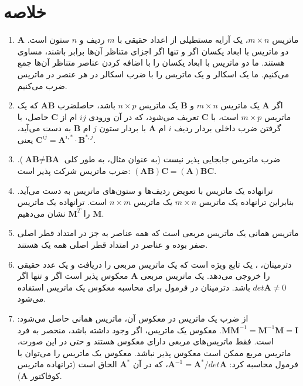\section{\textbf{خلاصه}}
\label{sec:2.9}
{
    \Large
    \begin{spacing}{1.5}
        \begin{enumerate}[label=\textbf{\arabic*}.]
            \item {$\textbf{A}$ ماتریس $m\times n$، یک آرایه مستطیلی از اعداد حقیقی با $m$ ردیف و $n$ ستون است.
            دو ماتریس با ابعاد یکسان اگر و تنها اگر اجزای متناظر آن‌ها برابر باشند، مساوی هستند.
            ما دو ماتریس با ابعاد یکسان را با اضافه کردن عناصر متناظر آن‌ها جمع می‌کنیم.
            ما یک اسکالر و یک ماتریس را با ضرب اسکالر در هر عنصر در ماتریس ضرب می‌کنیم.}

            \item {اگر $\textbf{A}$ یک ماتریس $m\times n$ و $\textbf{B}$ یک ماتریس $n\times p$ باشد،
            حاصلضرب $\textbf{AB}$ که یک ماتریس $m\times p$ است، با $\textbf{C}$ تعریف می‌شود،
            که در آن ورودی $ij$ ام از $\textbf{C}$ حاصل، با گرفتن ضرب داخلی بردار ردیف $i$ ام $\textbf{A}$ با بردار ستون $j$ ام $\textbf{B}$ به دست می‌آید، یعنی $\textbf{C}^{ij}=\textbf{A}^{i,*}\cdot\textbf{B}^{*,j}$.}

            \item {ضرب ماتریس جابجایی پذیر نیست (به عنوان مثال، به طور کلی $\textbf{AB}\neq\textbf{BA}$). ضرب ماتریس شرکت پذیر است: $(\textbf{AB})\textbf{C}=(\textbf{A})\textbf{BC}$.}

            \item {ترانهاده یک ماتریس با تعویض ردیف‌ها و ستون‌های ماتریس به دست می‌آید.
            بنابراین ترانهاده یک ماتریس $m\times n$ یک ماتریس $n\times m$ است.
            ترانهاده یک ماتریس $\textbf{M}$ را $\textbf{M}^{T}$ نشان می‌دهیم.}

            \item {ماتریس همانی یک ماتریس مربعی است که همه عناصر به جز در امتداد قطر اصلی صفر بوده و عناصر در امتداد قطر اصلی همه یک هستند.}

            \item {دترمینان، ، یک تابع ویژه است که یک ماتریس مربعی را دریافت و یک عدد حقیقی را خروجی می‌دهد.
            یک ماتریس مربعی $\textbf{A}$ معکوس پذیر است اگر و تنها اگر $det\textbf{A}\neq 0$ باشد.
            دترمینان در فرمول برای محاسبه معکوس یک ماتریس استفاده می‌شود.}

            \item {از ضرب یک ماتریس در معکوس آن، ماتریس همانی حاصل می‌شود: $\textbf{M}\textbf{M}^{-1}=\textbf{M}^{-1}\textbf{M}=\textbf{I}$.
            معکوس یک ماتریس، اگر وجود داشته باشد، منحصر به فرد است.
            فقط ماتریس‌های مربعی دارای معکوس هستند و حتی در این صورت، ماتریس مربع ممکن است معکوس پذیر نباشد.
            معکوس یک ماتریس را می‌توان با فرمول محاسبه کرد: $\textbf{A}^{-1}=\textbf{A}^{*}/det\textbf{A}$، که در آن $\textbf{A}^{*}$ الحاق است (ترانهاده ماتریس کوفاکتور $\textbf{A}$).}


\end{enumerate}
\end{spacing}}
